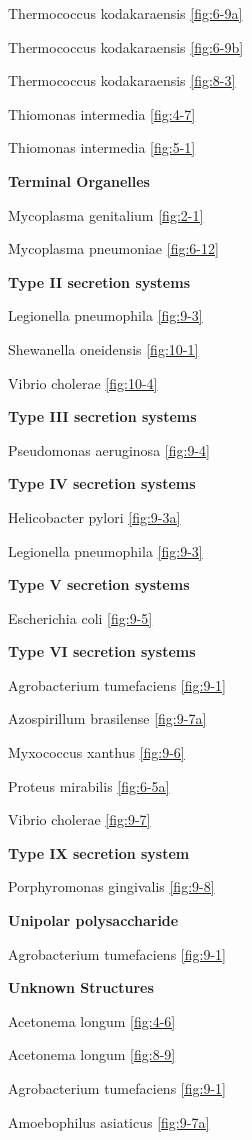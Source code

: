\documentclass[]{tufte-book}
\begin{document}
Thermococcus kodakaraensis \ref{fig:6-9a}

Thermococcus kodakaraensis \ref{fig:6-9b}

Thermococcus kodakaraensis \ref{fig:8-3}

Thiomonas intermedia \ref{fig:4-7}

Thiomonas intermedia \ref{fig:5-1}

\textbf{Terminal Organelles}

Mycoplasma genitalium \ref{fig:2-1}

Mycoplasma pneumoniae \ref{fig:6-12}

\textbf{Type II secretion systems}

Legionella pneumophila \ref{fig:9-3}

Shewanella oneidensis \ref{fig:10-1}

Vibrio cholerae \ref{fig:10-4}

\textbf{Type III secretion systems}

Pseudomonas aeruginosa \ref{fig:9-4}

\textbf{Type IV secretion systems}

Helicobacter pylori \ref{fig:9-3a}

Legionella pneumophila \ref{fig:9-3}

\textbf{Type V secretion systems}

Escherichia coli \ref{fig:9-5}

\textbf{Type VI secretion systems}

Agrobacterium tumefaciens \ref{fig:9-1}

Azospirillum brasilense \ref{fig:9-7a}

Myxococcus xanthus \ref{fig:9-6}

Proteus mirabilis \ref{fig:6-5a}

Vibrio cholerae \ref{fig:9-7}

\textbf{Type IX secretion system}

Porphyromonas gingivalis \ref{fig:9-8}

\textbf{Unipolar polysaccharide}

Agrobacterium tumefaciens \ref{fig:9-1}

\textbf{Unknown Structures}

Acetonema longum \ref{fig:4-6}

Acetonema longum \ref{fig:8-9}

Agrobacterium tumefaciens \ref{fig:9-1}

Amoebophilus asiaticus \ref{fig:9-7a}
\end{document}
